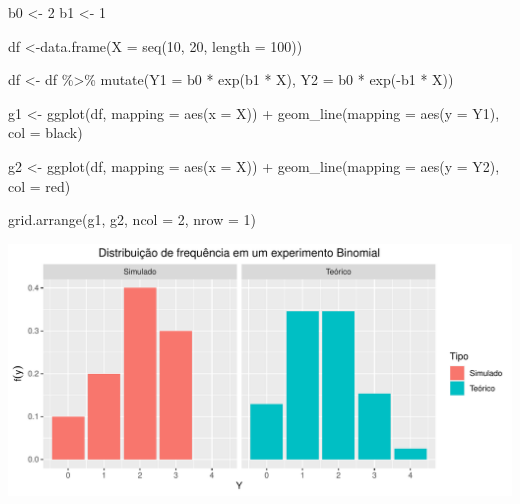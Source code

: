 \documentclass[
]{book}
\newenvironment{Shaded}{\begin{snugshade}}{\end{snugshade}}
\newcommand{\AttributeTok}[1]{\textcolor[rgb]{0.77,0.63,0.00}{#1}}
\newcommand{\DecValTok}[1]{\textcolor[rgb]{0.00,0.00,0.81}{#1}}
\newcommand{\FunctionTok}[1]{\textcolor[rgb]{0.00,0.00,0.00}{#1}}
\newcommand{\NormalTok}[1]{#1}
\newcommand{\OtherTok}[1]{\textcolor[rgb]{0.56,0.35,0.01}{#1}}
\newcommand{\SpecialCharTok}[1]{\textcolor[rgb]{0.00,0.00,0.00}{#1}}
\newcommand{\StringTok}[1]{\textcolor[rgb]{0.31,0.60,0.02}{#1}}
\begin{document}
\begin{Shaded}
\begin{Highlighting}[]
\NormalTok{b0 }\OtherTok{\textless{}{-}} \DecValTok{2}
\NormalTok{b1 }\OtherTok{\textless{}{-}} \DecValTok{1}

\NormalTok{df }\OtherTok{\textless{}{-}}\FunctionTok{data.frame}\NormalTok{(}\AttributeTok{X =} \FunctionTok{seq}\NormalTok{(}\DecValTok{10}\NormalTok{, }\DecValTok{20}\NormalTok{, }\AttributeTok{length =} \DecValTok{100}\NormalTok{))}

\NormalTok{df }\OtherTok{\textless{}{-}}\NormalTok{ df }\SpecialCharTok{\%\textgreater{}\%} \FunctionTok{mutate}\NormalTok{(}\AttributeTok{Y1 =}\NormalTok{ b0 }\SpecialCharTok{*} \FunctionTok{exp}\NormalTok{(b1 }\SpecialCharTok{*}\NormalTok{ X),}
                    \AttributeTok{Y2 =}\NormalTok{ b0 }\SpecialCharTok{*} \FunctionTok{exp}\NormalTok{(}\SpecialCharTok{{-}}\NormalTok{b1 }\SpecialCharTok{*}\NormalTok{ X))}

\NormalTok{g1 }\OtherTok{\textless{}{-}} \FunctionTok{ggplot}\NormalTok{(df, }\AttributeTok{mapping =} \FunctionTok{aes}\NormalTok{(}\AttributeTok{x =}\NormalTok{ X)) }\SpecialCharTok{+}
  \FunctionTok{geom\_line}\NormalTok{(}\AttributeTok{mapping =} \FunctionTok{aes}\NormalTok{(}\AttributeTok{y =}\NormalTok{ Y1), }\AttributeTok{col =} \StringTok{\textquotesingle{}black\textquotesingle{}}\NormalTok{)}

\NormalTok{g2 }\OtherTok{\textless{}{-}} \FunctionTok{ggplot}\NormalTok{(df, }\AttributeTok{mapping =} \FunctionTok{aes}\NormalTok{(}\AttributeTok{x =}\NormalTok{ X)) }\SpecialCharTok{+}
  \FunctionTok{geom\_line}\NormalTok{(}\AttributeTok{mapping =} \FunctionTok{aes}\NormalTok{(}\AttributeTok{y =}\NormalTok{ Y2), }\AttributeTok{col =} \StringTok{\textquotesingle{}red\textquotesingle{}}\NormalTok{)}

\FunctionTok{grid.arrange}\NormalTok{(g1, g2, }\AttributeTok{ncol =} \DecValTok{2}\NormalTok{, }\AttributeTok{nrow =} \DecValTok{1}\NormalTok{)}
\end{Highlighting}
\end{Shaded}

\begin{center}\includegraphics{probest-cambientais_files/figure-latex/unnamed-chunk-229-1} \end{center}
\end{document}
